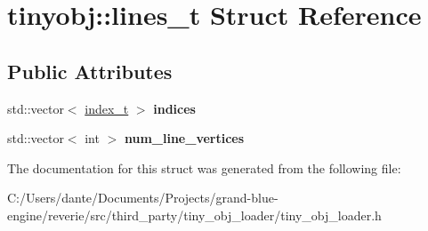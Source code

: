 \hypertarget{structtinyobj_1_1lines__t}{}\section{tinyobj\+::lines\+\_\+t Struct Reference}
\label{structtinyobj_1_1lines__t}
\subsection*{Public Attributes}
\begin{DoxyCompactItemize}
\item 
\mbox{\label{structtinyobj_1_1lines__t_ae8e657a640bb28279c402646a8addcd8}} 
std\+::vector$<$ \mbox{\hyperlink{structtinyobj_1_1index__t}{index\+\_\+t}} $>$ {\bfseries indices}
\item 
\mbox{\label{structtinyobj_1_1lines__t_a97270228c686b420540510c138df7ab3}} 
std\+::vector$<$ int $>$ {\bfseries num\+\_\+line\+\_\+vertices}
\end{DoxyCompactItemize}


The documentation for this struct was generated from the following file\+:\begin{DoxyCompactItemize}
\item 
C\+:/\+Users/dante/\+Documents/\+Projects/grand-\/blue-\/engine/reverie/src/third\+\_\+party/tiny\+\_\+obj\+\_\+loader/tiny\+\_\+obj\+\_\+loader.\+h\end{DoxyCompactItemize}
